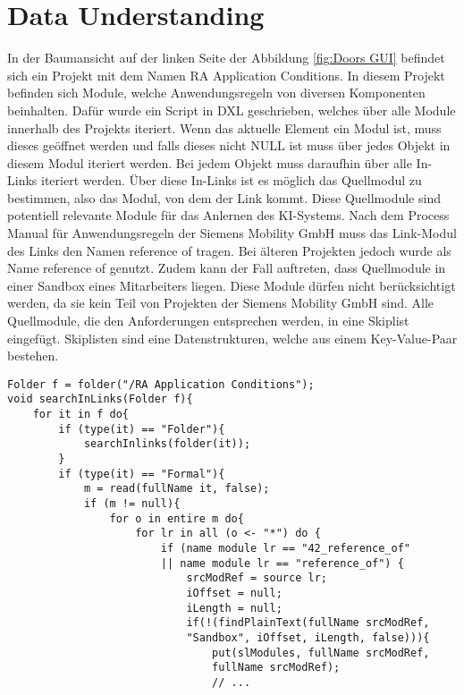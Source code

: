 \section{Data Understanding}
\label{chap:DataUnderstanding}

In der Baumansicht auf der linken Seite der Abbildung \ref*{fig:Doors GUI} befindet sich ein Projekt mit dem Namen \glqq RA Application Conditions\grqq{}. In diesem Projekt befinden sich Module, welche
Anwendungsregeln von diversen Komponenten beinhalten. Dafür wurde ein Script in \ac*{DXL} geschrieben, welches über alle Module innerhalb des Projekts iteriert. Wenn das aktuelle Element ein Modul ist,
muss dieses geöffnet werden und falls dieses nicht NULL ist muss über jedes Objekt in diesem Modul iteriert werden. Bei jedem Objekt muss daraufhin über alle In-Links iteriert werden. Über diese 
In-Links ist es möglich das Quellmodul zu bestimmen, also das Modul, von dem der Link kommt. Diese Quellmodule sind potentiell relevante Module für das Anlernen des KI-Systems. Nach dem Process Manual für
Anwendungsregeln der Siemens Mobility GmbH \cite[S.32]{q2} muss das Link-Modul des Links den Namen  reference of\grqq{} tragen. Bei älteren Projekten jedoch wurde als Name 
\glqq reference of\grqq{} genutzt. Zudem kann der Fall auftreten, dass Quellmodule in einer Sandbox eines Mitarbeiters liegen. Diese Module dürfen nicht berücksichtigt werden, da sie kein Teil
von Projekten der Siemens Mobility GmbH sind. Alle Quellmodule, die den Anforderungen entsprechen werden, in eine Skiplist eingefügt. Skiplisten sind eine Datenstrukturen, welche aus einem 
Key-Value-Paar bestehen. 

\begin{lstlisting}[caption={Iterieren über alle Module von RA Application Conditions},captionpos=b, label = lst:searchInLinks]
Folder f = folder("/RA Application Conditions");
void searchInLinks(Folder f){
    for it in f do{
        if (type(it) == "Folder"){
            searchInlinks(folder(it));
        }
        if (type(it) == "Formal"){
            m = read(fullName it, false);
            if (m != null){
                for o in entire m do{
                    for lr in all (o <- "*") do {
                        if (name module lr == "42_reference_of" 
                        || name module lr == "reference_of") {
                            srcModRef = source lr;
                            iOffset = null;
                            iLength = null;
                            if(!(findPlainText(fullName srcModRef, 
                            "Sandbox", iOffset, iLength, false))){
                                put(slModules, fullName srcModRef, 
                                fullName srcModRef);
                                // ...
\end{lstlisting}

